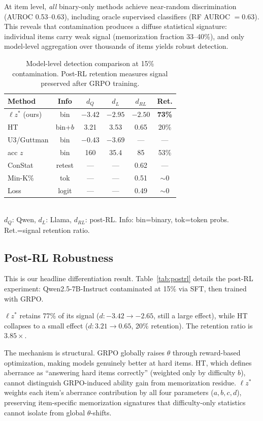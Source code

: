\documentclass[11pt,a4paper]{article}
\newcommand{\lzstar}{$\ell z^*$}
\begin{document}
At item level, \emph{all} binary-only methods achieve near-random discrimination (AUROC 0.53--0.63), including oracle supervised classifiers (RF AUROC $=0.63$). This reveals that contamination produces a diffuse statistical signature: individual items carry weak signal (memorization fraction 33--40\%), and only model-level aggregation over thousands of items yields robust detection.

\begin{table}[t]
\centering
\caption{Model-level detection comparison at 15\% contamination. Post-RL retention measures signal preserved after GRPO training.}
\label{tab:baselines}
\small
\begin{tabular}{lccccc}
\toprule
Method & Info & $d_Q$ & $d_L$ & $d_{RL}$ & Ret. \\
\midrule
$\ell z^*$ (ours) & bin & $-3.42$ & $-2.95$ & $\mathbf{-2.50}$ & \textbf{73\%} \\
HT & bin+$b$ & 3.21 & 3.53 & 0.65 & 20\% \\
U3/Guttman & bin & $-0.43$ & $-3.69$ & --- & --- \\
acc $z$ & bin & 160 & 35.4 & 85 & 53\% \\
ConStat & retest & --- & --- & 0.62 & --- \\
Min-K\% & tok & --- & --- & 0.51 & ${\sim}0$ \\
Loss & logit & --- & --- & 0.49 & ${\sim}0$ \\
\bottomrule
\end{tabular}
\\[2pt]
{\footnotesize $d_Q$: Qwen, $d_L$: Llama, $d_{RL}$: post-RL. Info: bin=binary, tok=token probs. Ret.=signal retention ratio.}
\end{table}

\subsection{Post-RL Robustness}\label{sec:postrl}

This is our headline differentiation result. Table~\ref{tab:postrl} details the post-RL experiment: Qwen2.5-7B-Instruct contaminated at 15\% via SFT, then trained with GRPO.

\lzstar{} retains 77\% of its signal ($d: -3.42 \to -2.65$, still a large effect), while HT collapses to a small effect ($d: 3.21 \to 0.65$, 20\% retention). The retention ratio is $3.85\times$.

The mechanism is structural. GRPO globally raises $\theta$ through reward-based optimization, making models genuinely better at hard items. HT, which defines aberrance as ``answering hard items correctly'' (weighted only by difficulty $b$), cannot distinguish GRPO-induced ability gain from memorization residue. \lzstar{} weights each item's aberrance contribution by all four parameters ($a, b, c, d$), preserving item-specific memorization signatures that difficulty-only statistics cannot isolate from global $\theta$-shifts.
\end{document}

